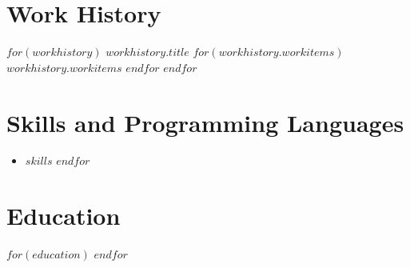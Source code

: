 \documentclass{res}
\begin{document}
\section{Work History}
$for(workhistory)$
$workhistory.title$
\workitems
$for(workhistory.workitems)$
{$workhistory.workitems$}
$endfor$
$endfor$
\section{Skills and Programming Languages}
\begin{itemize}
\setlength\itemsep{-0.5em}
$for(skills)$
\item\normalsize $skills$
$endfor$
\end{itemize}
\section{Education}
$for(education)$
$endfor$
\end{document}
